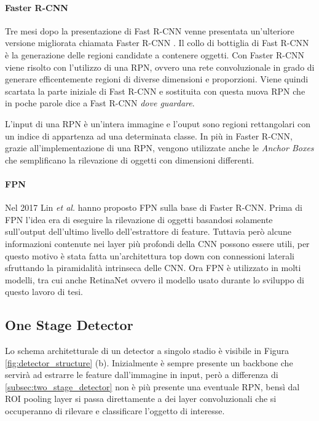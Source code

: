 \paragraph{Faster R-CNN}
Tre mesi dopo la presentazione di Fast R-CNN venne presentata un'ulteriore versione migliorata chiamata Faster R-CNN \cite{ren2015faster}. Il collo di bottiglia di Fast R-CNN è la generazione delle regioni candidate a contenere oggetti. Con Faster R-CNN viene risolto con l'utilizzo di una \ac{RPN}, ovvero una rete convoluzionale in grado di generare efficentemente regioni di diverse dimensioni e proporzioni. Viene quindi scartata la parte iniziale di Fast R-CNN e sostituita con questa nuova \ac{RPN} che in poche parole dice a Fast R-CNN \textit{dove guardare}.

L'input di una \ac{RPN} è un'intera immagine e l'ouput sono regioni rettangolari con un indice di appartenza ad una determinata classe. 
In più in Faster R-CNN, grazie all'implementazione di una \ac{RPN}, vengono utilizzate anche le \textit{Anchor Boxes} che semplificano la rilevazione di oggetti con dimensioni differenti. 
\paragraph{FPN}
Nel 2017 Lin \textit{et al.} hanno proposto \ac{FPN} \cite{lin2017feature} sulla base di Faster R-CNN. Prima di \ac{FPN} l'idea era di eseguire la rilevazione di oggetti basandosi solamente sull'output dell'ultimo livello dell'estrattore di feature. Tuttavia però alcune informazioni contenute nei layer più profondi della \ac{CNN} possono essere utili, per questo motivo è stata fatta un'architettura top down con connessioni laterali sfruttando la piramidalità intrinseca delle \ac{CNN}. Ora \ac{FPN} è utilizzato in molti modelli, tra cui anche RetinaNet ovvero il modello usato durante lo sviluppo di questo lavoro di tesi. 


\subsection{One Stage Detector}
\label{subsec:one_stage_detector}
Lo schema architetturale di un detector a singolo stadio è visibile in Figura \ref{fig:detector_structure} (b). Inizialmente è sempre presente un backbone che servirà ad estrarre le feature dall'immagine in input, però a differenza di \ref{subsec:two_stage_detector} non è più presente una eventuale \ac{RPN}, bensì dal \ac{ROI} pooling layer si passa direttamente a dei layer convoluzionali che si occuperanno di rilevare e classificare l'oggetto di interesse. 

